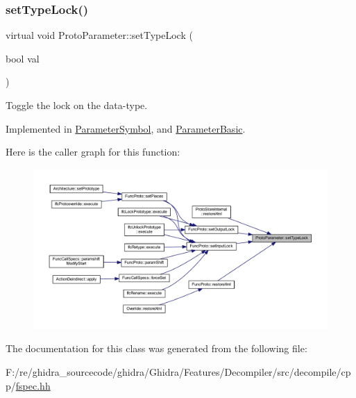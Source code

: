 \subsubsection{\texorpdfstring{setTypeLock()}{setTypeLock()}}
{\footnotesize\ttfamily virtual void Proto\+Parameter\+::set\+Type\+Lock (\begin{DoxyParamCaption}\item[{bool}]{val }\end{DoxyParamCaption})\hspace{0.3cm}{\ttfamily [pure virtual]}}



Toggle the lock on the data-\/type. 



Implemented in \mbox{\hyperlink{class_parameter_symbol_a87a4c3430377ccdd1efa5c3c4d720e9c}{Parameter\+Symbol}}, and \mbox{\hyperlink{class_parameter_basic_a70625ea5b34cdbe76fab93a029b6eb55}{Parameter\+Basic}}.

Here is the caller graph for this function\+:
\nopagebreak
\begin{figure}[H]
\begin{center}
\leavevmode
\includegraphics[width=350pt]{class_proto_parameter_a91f745d13f913e959f724e7259c52fa2_icgraph}
\end{center}
\end{figure}


The documentation for this class was generated from the following file\+:\begin{DoxyCompactItemize}
\item 
F\+:/re/ghidra\+\_\+sourcecode/ghidra/\+Ghidra/\+Features/\+Decompiler/src/decompile/cpp/\mbox{\hyperlink{fspec_8hh}{fspec.\+hh}}\end{DoxyCompactItemize}
